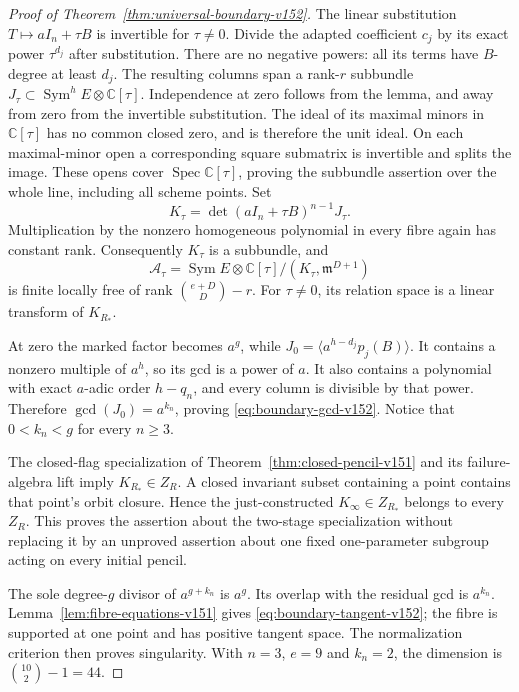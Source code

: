 \documentclass[11pt,reqno]{amsart}
\numberwithin{equation}{section}
\theoremstyle{definition}\newtheorem{definition}[theorem]{Definition}
\theoremstyle{remark}\newtheorem{remark}[theorem]{Remark}
\newcommand{\C}{\mathbb C}\newcommand{\Q}{\mathbb Q}
\DeclareMathOperator{\Sym}{Sym}\DeclareMathOperator{\Gr}{Gr}
\begin{document}
\begin{proof}[Proof of Theorem~\ref{thm:universal-boundary-v152}]
The linear substitution $T\mapsto aI_n+\tau B$ is invertible for
$\tau\ne0$.  Divide the adapted coefficient $c_j$ by its exact
power $\tau^{d_j}$ after substitution.  There are no negative powers:
all its terms have $B$-degree at least $d_j$.  The resulting columns
span a rank-$r$ subbundle $J_\tau\subset\Sym^h E\otimes\C[\tau]$.
Independence at zero follows from the lemma, and away from zero from
the invertible substitution.  The ideal of its maximal minors in $\C[\tau]$ has no common
closed zero, and is therefore the unit ideal. On each maximal-minor
open a corresponding square submatrix is invertible and splits the
image. These opens cover $\operatorname{Spec}\C[\tau]$, proving the
subbundle assertion over the whole line, including all scheme points.  Set
\[
                 K_\tau=\det(aI_n+\tau B)^{n-1}J_\tau.
\]
Multiplication by the nonzero homogeneous polynomial in every fibre
again has constant rank.  Consequently $K_\tau$ is a subbundle, and
\[
 \mathcal A_\tau=\Sym E\otimes\C[\tau]\big/
                           (K_\tau,\mathfrak m^{D+1})
\]
is finite locally free of rank $\binom{e+D}{D}-r$.
For $\tau\ne0$, its relation space is a linear transform of $K_{R_*}$.

At zero the marked factor becomes $a^g$, while
$J_0=\langle a^{h-d_j}p_j(B)\rangle$.  It contains a nonzero multiple
of $a^h$, so its gcd is a power of $a$.  It also contains a polynomial
with exact $a$-adic order $h-q_n$, and every column is divisible by
that power.  Therefore $\gcd(J_0)=a^{k_n}$, proving
\eqref{eq:boundary-gcd-v152}.  Notice that $0<k_n<g$ for every
$n\geq3$.

The closed-flag specialization of Theorem~\ref{thm:closed-pencil-v151}
and its failure-algebra lift imply
$K_{R_*}\in Z_R$.  A closed invariant subset containing a point
contains that point's orbit closure.  Hence the just-constructed
$K_\infty\in Z_{R_*}$ belongs to every $Z_R$.  This proves the
assertion about the two-stage specialization without replacing it
by an unproved assertion about one fixed one-parameter subgroup
acting on every initial pencil.

The sole degree-$g$ divisor of $a^{g+k_n}$ is $a^g$.  Its overlap
with the residual gcd is $a^{k_n}$.  Lemma~\ref{lem:fibre-equations-v151}
gives \eqref{eq:boundary-tangent-v152}; the fibre is supported at one
point and has positive tangent space.  The normalization criterion
then proves singularity.  With $n=3$, $e=9$ and $k_n=2$, the dimension
is $\binom{10}{2}-1=44$.
\end{proof}
\end{document}
